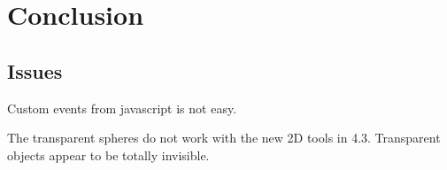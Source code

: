 \section{Conclusion}


\subsection{Issues}
Custom events from javascript is not easy.

The transparent spheres do not work with the new 2D tools in 4.3. Transparent objects appear to be totally invisible.